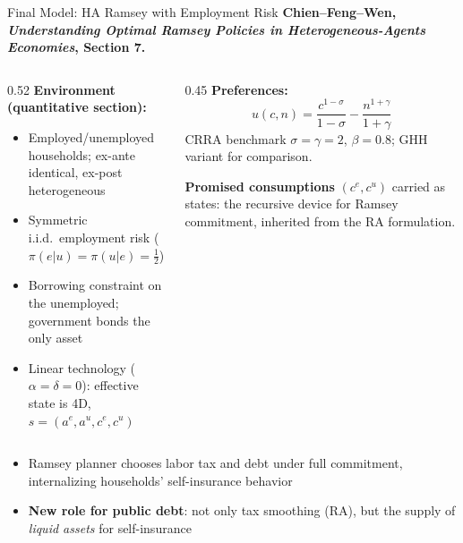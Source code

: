 \documentclass[10pt,aspectratio=169]{beamer}
\begin{document}
\begin{frame}{Final Model: HA Ramsey with Employment Risk}
\textbf{Chien--Feng--Wen, \emph{Understanding Optimal Ramsey Policies in Heterogeneous-Agents Economies}, Section 7.}

\medskip
\begin{columns}[T]
\begin{column}{0.52\textwidth}
\textbf{Environment (quantitative section):}
\begin{itemize}
    \item Employed/unemployed households; ex-ante identical, ex-post heterogeneous
    \item Symmetric i.i.d.\ employment risk ($\pi(e|u)=\pi(u|e)=\tfrac12$)
    \item Borrowing constraint on the unemployed; government bonds the only asset
    \item Linear technology ($\alpha=\delta=0$): effective state is 4D, $s=(a^e, a^u, c^e, c^u)$
\end{itemize}
\end{column}
\begin{column}{0.45\textwidth}
\textbf{Preferences:}
\[
u(c,n) = \frac{c^{1-\sigma}}{1-\sigma} - \frac{n^{1+\gamma}}{1+\gamma}
\]
CRRA benchmark $\sigma=\gamma=2$, $\beta=0.8$; GHH variant for comparison.

\medskip
\textbf{Promised consumptions} $(c^e, c^u)$ carried as states: the recursive device for
Ramsey commitment, inherited from the RA formulation.
\end{column}
\end{columns}

\smallskip
\begin{itemize}\small
    \item Ramsey planner chooses labor tax and debt under full commitment, internalizing
          households' self-insurance behavior
    \item \textbf{New role for public debt}: not only tax smoothing (RA), but the supply of
          \emph{liquid assets} for self-insurance
\end{itemize}
\end{frame}
\end{document}
